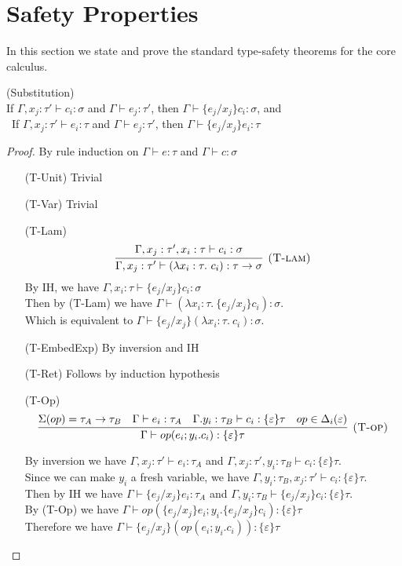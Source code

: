 \section{Safety Properties}
In this section we state and prove the standard type-safety theorems for the core calculus.
\begin{lemma} (Substitution) \\
If $\Gamma, x_j : \tau' \vdash c_i : \sigma$ and $\Gamma \vdash e_j : \tau'$, then $\Gamma \vdash \{e_j/x_j\}c_i : \sigma$, and\\\
If $\Gamma, x_j : \tau' \vdash e_i : \tau $ and $\Gamma \vdash e_j : \tau'$, then $\Gamma \vdash \{e_j/x_j\}e_i : \tau$

\begin{proof}
By rule induction on $\Gamma \vdash e : \tau$ and $\Gamma \vdash c : \sigma$
\begin{enumerate}[align=left]
\item[(T-Unit)] Trivial
\item[(T-Var)] Trivial
\item[(T-Lam)] 
$$
\infer[\textsc{(T-lam)}]
  {\Gamma, x_j : \tau'  \vdash (\lambda x_i: \tau.\ c_i) : \tau \rightarrow \sigma}
  {\Gamma,x_j : \tau',  x_i:\tau \vdash c_i : \sigma} 
$$
By IH, we have $\Gamma, x_i:\tau \vdash \{e_j/x_j\}c_i : \sigma$\\
Then by (T-Lam) we have $\Gamma \vdash (\lambda x_i : \tau.\ \{e_j/x_j\}c_i) : \sigma$.\\
Which is equivalent to $\Gamma \vdash \{e_j/x_j\}(\lambda x_i : \tau.\ c_i) : \sigma$.
\item[(T-EmbedExp)] By inversion and IH
\item[(T-Ret)] Follows by induction hypothesis
\item[(T-Op)]  
$$
\infer[\textsc{(T-op)}]
  {\Gamma\vdash op(e_i; y_i.c_i) : \{\varepsilon\}\tau }
  {\Sigma(op) = \tau_A \rightarrow \tau_B & \Gamma \vdash e_i : \tau_A & \Gamma. y_i:\tau_B\vdash c_i: \{\varepsilon\}\tau & op \in \Delta_i(\varepsilon)} 
$$

By inversion we have $\Gamma, x_j : \tau' \vdash e_i : \tau_A$ and $\Gamma, x_j : \tau', y_i : \tau_B \vdash c_i : \{\varepsilon\} \tau$. \\
Since we can make $y_i$ a fresh variable, we have $\Gamma,  y_i : \tau_B, x_j:\tau' \vdash c_i : \{\varepsilon\} \tau$.\\
Then by IH we have $\Gamma \vdash \{e_j/x_j\}e_i : \tau_A$ and $\Gamma,  y_i : \tau_B \vdash \{e_j/x_j\}c_i : \{\varepsilon\} \tau$.\\
By (T-Op) we have $\Gamma \vdash op(\{e_j/x_j\}e_i; y_i.\{e_j/x_j\}c_i) : \{\varepsilon\}\tau$\\
Therefore we have $\Gamma \vdash \{e_j/x_j\}(op(e_i; y_i.c_i)) : \{\varepsilon\}\tau$


\end{enumerate}
\end{proof}
\end{lemma}
